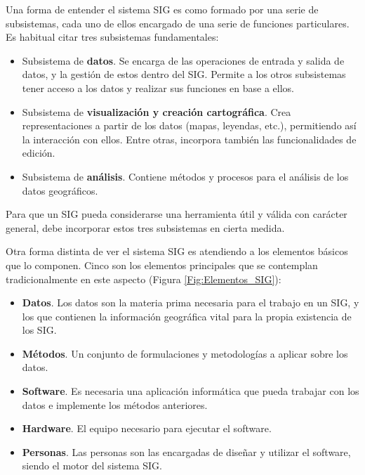 Una forma de entender el sistema SIG es como formado por una serie de subsistemas, cada uno de ellos encargado de una serie de funciones particulares. Es habitual citar tres subsistemas fundamentales:

\begin{itemize}
	\item Subsistema de \textbf{datos}. Se encarga de las operaciones de entrada y salida de datos, y la gestión de estos dentro del SIG. Permite a los otros subsistemas tener acceso a los datos y realizar sus funciones en base a ellos.
	\item Subsistema de \textbf{visualización y creación cartográfica}. Crea representaciones a partir de los datos (mapas, leyendas, etc.), permitiendo así la interacción con ellos. Entre otras, incorpora también las funcionalidades de edición.
	\item Subsistema de \textbf{análisis}. Contiene métodos y procesos para el análisis de los datos geográficos.
\end{itemize}

Para que un SIG pueda considerarse una herramienta útil y válida con carácter general, debe incorporar estos tres subsistemas en cierta medida\cite{ESRI2003ESRI}.

Otra forma distinta de ver el sistema SIG es atendiendo a los elementos básicos que lo componen. Cinco son los elementos principales que se contemplan tradicionalmente en este aspecto (Figura \ref{Fig:Elementos_SIG}):

\begin{itemize}
 \item \textbf{Datos}. Los datos son la materia prima necesaria para el trabajo en un SIG, y los que contienen la información geográfica vital para la propia existencia de los SIG.
\item \textbf{Métodos}. Un conjunto de formulaciones y metodologías a aplicar sobre los datos.
\item \textbf{Software}. Es necesaria una aplicación informática que pueda trabajar con los datos e implemente los métodos anteriores.
\item \textbf{Hardware}. El equipo necesario para ejecutar el software.
\item \textbf{Personas}. Las personas son las encargadas de diseñar y utilizar el software, siendo el motor del sistema SIG.
\end{itemize}

